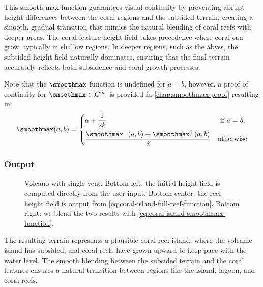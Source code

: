 This smooth max function guarantees visual continuity by preventing abrupt height differences between the coral regions and the subsided terrain, creating a smooth, gradual transition that mimics the natural blending of coral reefs with deeper areas. The coral feature height field takes precedence where coral can grow, typically in shallow regions. In deeper regions, such as the abyss, the subsided height field naturally dominates, ensuring that the final terrain accurately reflects both subsidence and coral growth processes.

Note that the $\smoothmax$ function is undefined for $a = b$, however, a proof of continuity for $\smoothmax \in C^\infty$ is provided in \cref{chap:smoothmax-proof} resulting in:
\begin{align}
    \label{eq:coral-island-smoothmax-function}
    \smoothmax(a, b) = \begin{dcases}
        a + \frac{1}{2k} & \text{ if } a = b, \\
        \frac{\smoothmax^-(a, b) + \smoothmax^+(a, b)}{2} & \text{otherwise}
    \end{dcases}    
\end{align}

\subsubsection{Output}
\label{sec:coral-island-procedural-output}


\begin{figure}
    \caption{Volcano with single vent. Bottom left: the initial height field is computed directly from the user input. Bottom center: the reef height field is output from \cref{eq:coral-island-full-reef-function}. Bottom right: we blend the two results with \cref{eq:coral-island-smoothmax-function}.}
    \label{fig:coral-island-volcano-example}
\end{figure}

The resulting terrain represents a plausible coral reef island, where the volcanic island has subsided, and coral reefs have grown upward to keep pace with the water level. The smooth blending between the subsided terrain and the coral features ensures a natural transition between regions like the island, lagoon, and coral reefs.

